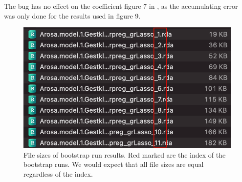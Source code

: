 \documentclass[twoside,twocolumn]{article}
\begin{document}
The bug has no effect on the coefficient figure 7 in \cite{zweifel_samarin_meusburger_alewell_2021}, as the accumulating error was only done for the results used in figure 9.

\begin{figure}
    \centering
  \includegraphics[width=\linewidth]{orig_filesize}
  \caption{File sizes of bootstrap run results. Red marked are the index of the bootstrap runs. We would expect that all file sizes are equal regardless of the index.}
  \label{fig:bug_evidence}
\end{figure}
\end{document}
